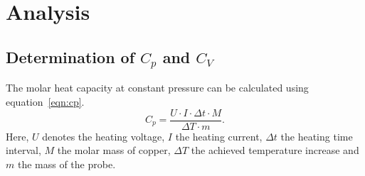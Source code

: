 \section{Analysis}
\subsection{Determination of \texorpdfstring{$C_{p}$}{C_p} and \texorpdfstring{$C_{V}$}{C_V}}
The molar heat capacity at constant pressure can be calculated using equation~\ref{eqn:cp}.
\begin{equation}
  C_{p} = \frac{U \cdot I \cdot \Delta t \cdot M}{\Delta T \cdot m}.
  \label{eqn:cp}
\end{equation}
Here, $U$ denotes the heating voltage, $I$ the heating current, $\Delta t$ the heating time interval,
$M$ the molar mass of copper, $\Delta T$ the achieved temperature increase and $m$ the mass of the probe.
